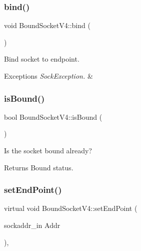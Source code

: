 \subsubsection{\texorpdfstring{bind()}{bind()}}
{\footnotesize\ttfamily void Bound\+Socket\+V4\+::bind (\begin{DoxyParamCaption}{ }\end{DoxyParamCaption})\hspace{0.3cm}{\ttfamily [virtual]}}

Bind socket to endpoint. 
\begin{DoxyExceptions}{Exceptions}
{\em Sock\+Exception.} & \\
\hline
\end{DoxyExceptions}
\mbox{\label{classBoundSocketV4_aa7a4ecb65ba394e04763bf486de67d4e}} 
\subsubsection{\texorpdfstring{is\+Bound()}{isBound()}}
{\footnotesize\ttfamily bool Bound\+Socket\+V4\+::is\+Bound (\begin{DoxyParamCaption}{ }\end{DoxyParamCaption})\hspace{0.3cm}{\ttfamily [inline]}}

Is the socket bound already? \begin{DoxyReturn}{Returns}
Bound status. 
\end{DoxyReturn}
\mbox{\label{classBoundSocketV4_ac1985788415bf47dd7c91980e5079f1a}} 
\subsubsection{\texorpdfstring{set\+End\+Point()}{setEndPoint()}\hspace{0.1cm}{\footnotesize\ttfamily [1/3]}}
{\footnotesize\ttfamily virtual void Bound\+Socket\+V4\+::set\+End\+Point (\begin{DoxyParamCaption}\item[{sockaddr\+\_\+in}]{Addr }\end{DoxyParamCaption})\hspace{0.3cm}{\ttfamily [inline]}, {\ttfamily [virtual]}}

